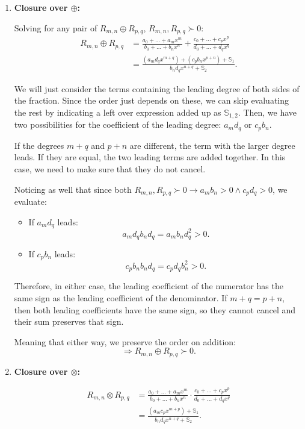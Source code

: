 \begin{solution}
\begin{enumerate}[label=\roman*)]
Therefore, exactly one of $$R_{m,n}=0,\qquad R_{m,n}\succ0,\qquad 0\succ R_{m,n}$$
holds, satisfying trichotomy.

\item \textbf{Closure over $\oplus$:}

Solving for any pair of $R_{m,n} \oplus R_{p,q}$, $R_{m,n}, R_{p,q} \succ 0$:
\begin{align*}
R_{m,n} \oplus R_{p,q}
&= \frac{a_0 + \dots + a_mx^m}{b_0 + \dots + b_nx^n}
+ \frac{c_0 + \dots + c_px^p}{d_0 + \dots + d_qx^q}\\
&= \frac{(a_md_qx^{m+q})+(c_pb_nx^{p+n}) + \mathbb{S}_1}
{b_nd_qx^{n+q} + \mathbb{S}_2}.
\end{align*}

We will just consider the terms containing the leading degree of both sides of the fraction. Since the order just depends on these, we can skip evaluating the rest by indicating a left over expression added up as $\mathbb{S}_{1,2}$. Then, we have two possibilities for the coefficient of the leading degree: $a_md_q$ or $c_pb_n$.

If the degrees $m+q$ and $p+n$ are different, the term with the larger degree leads. If they are equal, the two leading terms are added together. In this case, we need to make sure that they do not cancel.

Noticing as well that since both $R_{m,n}, R_{p,q} \succ 0 \rightarrow a_mb_n > 0 \land c_pd_q > 0$, we evaluate:
\begin{itemize}
	\item If $a_md_q$ leads:
	$$a_md_qb_nd_q = a_mb_n d_q^2 > 0.$$

	\item If $c_pb_n$ leads:
	$$c_pb_nb_nd_q = c_pd_q b_n^2 > 0.$$
\end{itemize}

Therefore, in either case, the leading coefficient of the numerator has the same sign as the leading coefficient of the denominator. If $m+q=p+n$, then both leading coefficients have the same sign, so they cannot cancel and their sum preserves that sign.

Meaning that either way, we preserve the order on addition:
$$\Rightarrow R_{m,n} \oplus R_{p,q} \succ 0.$$

\item \textbf{Closure over $\otimes$:}

\begin{align*}
R_{m,n} \otimes R_{p,q}
&= \frac{a_0 + \dots + a_mx^m}{b_0 + \dots + b_nx^n}
\cdot \frac{c_0 + \dots + c_px^p}{d_0 + \dots + d_qx^q}\\
&= \frac{(a_mc_px^{m+p}) + \mathbb{S}_1}
{b_nd_qx^{n+q} + \mathbb{S}_2}.
\end{align*}


\end{enumerate}
\end{solution}
